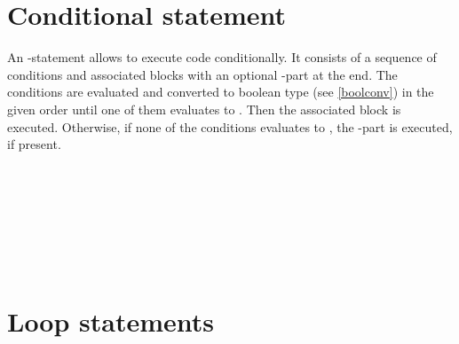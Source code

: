 \section{Conditional statement}

An -statement allows to execute code conditionally. It
consists of a sequence of conditions and associated blocks with an
optional -part at the end. The conditions are evaluated
and converted to boolean type (see \ref{boolconv}) in the given order
until one of them evaluates to . Then the associated
block is executed. Otherwise, if none of the conditions evaluates to
, the -part is executed, if present.

\begin{grammar}
      \produces {}
	 \lextoken{(}  \lextoken{)}
	  \\
      \produces {}
	 \lextoken{(}  \lextoken{)}
	    \\
      \produces {}
	 \lextoken{(}  \lextoken{)}
	   \\
      \produces {}
	 \lextoken{(}  \lextoken{)}
	  
	   \\
      \produces {} \\
      \produces {}  \\
      \produces {}
	 \lextoken{(}  \lextoken{)}
\end{grammar}

\section{Loop statements}

\begin{grammar}
      \produces {}
	 \lextoken{(}  \lextoken{)}
	  \\
      \produces {} 
	 \lextoken{(}  \lextoken{)}
	  \\
      \produces {} \lextoken{(}
	  \lextoken{,}
	  \lextoken{)}
	 \lextoken{(}  \lextoken{)}
	  \\
\end{grammar}

